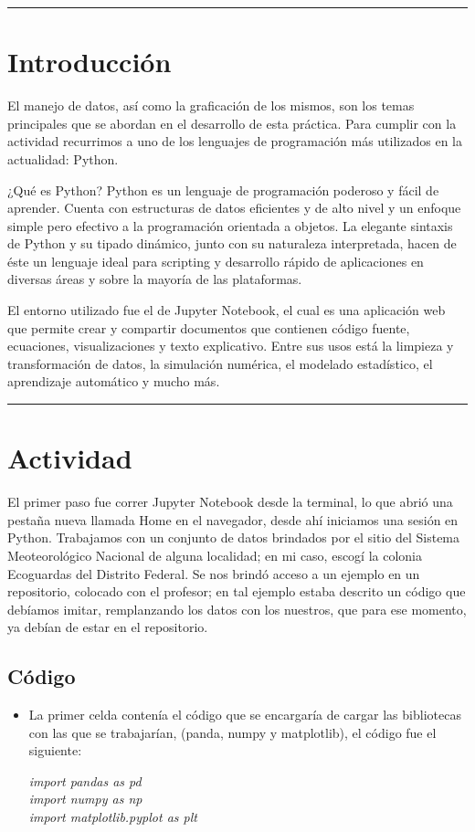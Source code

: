 \documentclass{article}
\begin{document}
\pagebreak
\begin{doublespace}

\hrule
\section{Introducción}
El manejo de datos, así como la graficación de los mismos, son los temas principales que se abordan en el desarrollo de esta práctica. Para cumplir con la actividad recurrimos a uno de los lenguajes de programación más utilizados en la actualidad: Python. 

¿Qué es Python? 
Python es un lenguaje de programación poderoso y fácil de aprender. Cuenta con estructuras de datos eficientes y de alto nivel y un enfoque simple pero efectivo a la programación orientada a objetos. La elegante sintaxis de Python y su tipado dinámico, junto con su naturaleza interpretada, hacen de éste un lenguaje ideal para scripting y desarrollo rápido de aplicaciones en diversas áreas y sobre la mayoría de las plataformas.

El entorno utilizado fue el de Jupyter Notebook, el cual es una aplicación web que permite crear y compartir documentos que contienen código fuente, ecuaciones, visualizaciones y texto explicativo. Entre sus usos está la limpieza y transformación de datos, la simulación numérica, el modelado estadístico, el aprendizaje automático y mucho más.
\vspace{0.5 cm}
\hrule
\vspace{0.6 cm}
\section{Actividad}
El primer paso fue correr Jupyter Notebook desde la terminal, lo que abrió una pestaña nueva llamada Home en el navegador, desde ahí iniciamos una sesión en Python.
Trabajamos con un conjunto de datos brindados por el sitio del Sistema Meoteorológico Nacional de alguna localidad; en mi caso, escogí la colonia Ecoguardas del Distrito Federal.
Se nos brindó acceso a un ejemplo en un repositorio, colocado con el profesor; en tal ejemplo estaba descrito un código que debíamos imitar, remplanzando los datos con los nuestros, que para ese momento, ya debían de estar en el repositorio.

\subsection{Código}
\begin{itemize}
\item La primer celda contenía el código que se encargaría de cargar las bibliotecas con las que se trabajarían,   (panda, numpy y matplotlib), el código fue el siguiente:
\begin{center}
\textit{import pandas as pd \\ import numpy as np \\ import matplotlib.pyplot as plt}
\end{center}


\end{itemize}
\end{doublespace}
\end{document}
